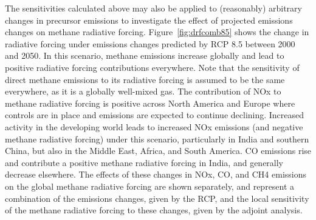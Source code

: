 The sensitivities calculated above may also be applied to (reasonably) arbitrary changes in precursor emissions to investigate the effect of projected emissions changes on methane radiative forcing. Figure~\ref{fig:drfcomb85} shows the change in radiative forcing under emissions changes predicted by RCP 8.5 between 2000 and 2050. In this scenario, methane emissions increase globally and lead to positive radiative forcing contributions everywhere. Note that the sensitivity of direct methane emissions to its radiative forcing is assumed to be the same everywhere, as it is a globally well-mixed gas. The contribution of NOx to methane radiative forcing is positive across North America and Europe where controls are in place and emissions are expected to continue declining. Increased activity in the developing world leads to increased NOx emissions (and negative methane radiative forcing) under this scenario, particularly in India and southern China, but also in the Middle East, Africa, and South America. CO emissions rise and contribute a positive methane radiative forcing in India, and generally decrease elsewhere. The effects of these changes in NOx, CO, and CH4 emissions on the global methane radiative forcing are shown separately, and represent a combination of the emissions changes, given by the RCP, and the local sensitivity of the methane radiative forcing to these changes, given by the adjoint analysis. 

